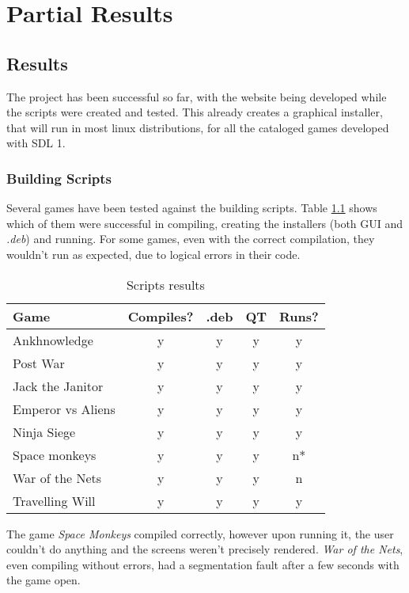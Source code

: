 \chapter[Partial Results]{Partial Results}

\section[Results]{Results}

The project has been successful so far, with the website being developed while the scripts were created and tested. This already creates a graphical installer, that will run in most linux distributions, for all the cataloged games developed with SDL 1.

\subsection[Building Scripts]{Building Scripts}

Several games have been tested against the building scripts. Table \ref{tab:script_games} shows which of them were successful in compiling, creating the installers (both GUI and \textit{.deb}) and running. For some games, even with the correct compilation, they wouldn't run as expected, due to logical errors in their code.

\begin{table}[h!]
\centering
\caption{Scripts results}
\label{tab:script_games}
\begin{tabular}{|l|c|c|c|c|}
\hline
\textbf{Game} & \multicolumn{1}{l|}{\textbf{Compiles?}} & \multicolumn{1}{l|}{\textbf{.deb}} & \multicolumn{1}{l|}{\textbf{QT}} & \multicolumn{1}{l|}{\textbf{Runs?}} \\ \hline
Ankhnowledge & y & y & y & y \\ \hline
Post War & y & y & y & y \\ \hline
Jack the Janitor & y & y & y & y \\ \hline
Emperor vs Aliens & y & y & y & y \\ \hline
Ninja Siege & y & y & y & y \\ \hline
Space monkeys & y & y & y & n* \\ \hline
War of the Nets & y & y & y & n \\ \hline
Travelling Will & y & y & y & y \\ \hline
\end{tabular}
\end{table}

The game \textit{Space Monkeys} compiled correctly, however upon running it, the user couldn't do anything and the screens weren't precisely rendered. \textit{War of the Nets}, even compiling without errors, had a segmentation fault after a few seconds with the game open.

